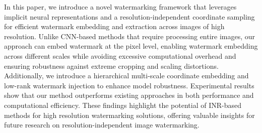 \documentclass{article}
\begin{document}
In this paper, we introduce a novel watermarking framework that leverages implicit neural representations and a resolution-independent coordinate sampling for efficient watermark embedding and extraction across images of high resolution.
Unlike CNN-based methods that require processing entire images, our approach can embed watermark at the pixel level, enabling watermark embedding across different scales while avoiding excessive computational overhead and ensuring robustness against extreme cropping and scaling distortions.
Additionally, we introduce a hierarchical multi-scale coordinate embedding and low-rank watermark injection to enhance model robustness.
Experimental results show that our method outperforms existing approaches in both performance and computational efficiency. 
These findings highlight the potential of INR-based methods for high resolution watermarking solutions, offering valuable insights for future research on resolution-independent image watermarking.













\end{document}

